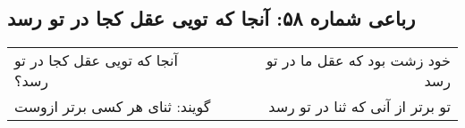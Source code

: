 \begin{center}
\section*{رباعی شماره ۵۸: آنجا که تویی عقل کجا در تو رسد}
\label{sec:058}
\begin{longtable}{l p{0.5cm} r}
آنجا که تویی عقل کجا در تو رسد؟
&&
خود زشت بود که عقل ما در تو رسد
\\
گویند: ثنای هر کسی برتر ازوست
&&
تو برتر از آنی که ثنا در تو رسد
\\
\end{longtable}
\end{center}
